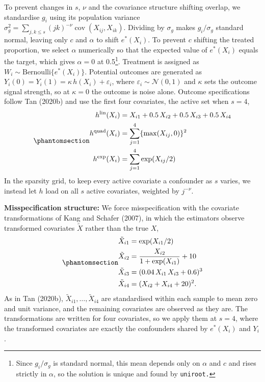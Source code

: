 \documentclass[
  12pt,
  a4paper,
]{article}
\begin{document}
To prevent changes in \(s\), \(\nu\) and the covariance structure
shifting overlap, we standardise \(g_i\) using its population variance
\(\sigma_g^2 = \sum_{j,k \le s} (jk)^{-\nu} \operatorname{cov}(X_{ij}, X_{ik})\).
Dividing by \(\sigma_g\) makes \(g_i/\sigma_g\) standard normal, leaving
only \(c\) and \(\alpha\) to shift \(e^*(X_i)\). To prevent \(c\)
shifting the treated proportion, we select \(\alpha\) numerically so
that the expected value of \(e^*(X_i)\) equals the target, which gives
\(\alpha = 0\) at 0.5\footnote{Since \(g_i/\sigma_g\) is standard
  normal, this mean depends only on \(\alpha\) and \(c\) and rises
  strictly in \(\alpha\), so the solution is unique and found by
  \texttt{uniroot.}}. Treatment is assigned as
\(W_i \sim \text{Bernoulli}\{e^*(X_i)\}\). Potential outcomes are
generated as \(Y_i(0) = Y_i(1) = \kappa\, h(X_i) + \varepsilon_i\),
where \(\varepsilon_i \sim \mathcal{N}(0, 1)\) and \(\kappa\) sets the
outcome signal strength, so at \(\kappa = 0\) the outcome is noise
alone. Outcome specifications follow Tan (2020b) and use the first four
covariates, the active set when \(s = 4\),
\begin{equation}\protect\phantomsection\label{eq-outcomes}{\begin{aligned}
h^{\text{lin}}(X_i)  &= X_{i1} + 0.5\,X_{i2} + 0.5\,X_{i3} + 0.5\,X_{i4} \\
h^{\text{quad}}(X_i) &= \sum_{j=1}^{4} \{\max(X_{ij}, 0)\}^2 \\
h^{\text{exp}}(X_i)  &= \sum_{j=1}^{4} \exp(X_{ij}/2)
\end{aligned}}\end{equation} In the sparsity grid, to keep every active
covariate a confounder as \(s\) varies, we instead let \(h\) load on all
\(s\) active covariates, weighted by \(j^{-\nu}\).

\textbf{Misspecification structure:} We force misspecification with the
covariate transformations of Kang and Schafer (2007), in which the
estimators observe transformed covariates \(\tilde{X}\) rather than the
true \(X\),
\begin{equation}\protect\phantomsection\label{eq-ks}{\begin{aligned}
\tilde{X}_{i1} &= \exp(X_{i1}/2) \\
\tilde{X}_{i2} &= \frac{X_{i2}}{1 + \exp(X_{i1})} + 10 \\
\tilde{X}_{i3} &= (0.04\,X_{i1}\,X_{i3} + 0.6)^3 \\
\tilde{X}_{i4} &= (X_{i2} + X_{i4} + 20)^2 .
\end{aligned}}\end{equation} As in Tan (2020b),
\(\tilde{X}_{i1}, \ldots, \tilde{X}_{i4}\) are standardised within each
sample to mean zero and unit variance, and the remaining covariates are
observed as they are. The transformations are written for four
covariates, so we apply them at \(s = 4\), where the transformed
covariates are exactly the confounders shared by \(e^*(X_i)\) and
\(Y_i\).
\end{document}

